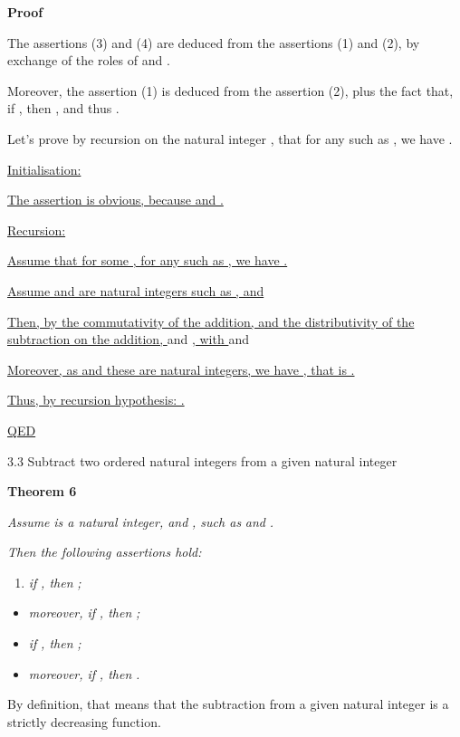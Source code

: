 \documentclass{article}
\providecommand{\tightlist}{%
  \setlength{\itemsep}{0pt}\setlength{\parskip}{0pt}}
\begin{document}
\textbf{Proof}

The assertions (3) and (4) are deduced from the assertions (1) and (2), by exchange of the roles of  and .

Moreover, the assertion (1) is deduced from the assertion (2), plus the fact that, if , then , and thus .

Let’s prove by recursion on the natural integer , that for any  such as , we have .

\ul{Initialisation}\ul{: }

\ul{The assertion is obvious, because }\ul{ and }\ul{.}

\ul{Recursion}\ul{: }

\ul{Assume that for some }\ul{, for any }\ul{ such as }\ul{, we have }\ul{.}

\ul{Assume }\ul{ and }\ul{ are natural integers such as }\ul{, and }

\ul{Then, by the commutativity of the addition, and the distributivity of the subtraction on the addition, } and \ul{, with } and \ul{ }



\ul{Moreover, as }\ul{ and these are natural integers, we have }\ul{, that is }\ul{.}

\ul{Thus, by recursion hypothesis: }\ul{.}

\ul{QED}

3.3 Subtract two ordered natural integers from a given natural integer

\textbf{Theorem 6}

\emph{Assume }\emph{ is a natural integer, and }\emph{, such as }\emph{ and }\emph{. }

\emph{Then the following assertions hold:}

\begin{enumerate}
\tightlist
\item \emph{if }\emph{, then }\emph{;}
\end{enumerate}

\begin{itemize}
\tightlist
\item \emph{moreover, if }\emph{, then }\emph{;}
\item \emph{if }\emph{, then }\emph{;}
\item \emph{moreover, if }\emph{, then }\emph{.}
\end{itemize}

By definition, that means that the subtraction from a given natural integer is a strictly decreasing function.
\end{document}
